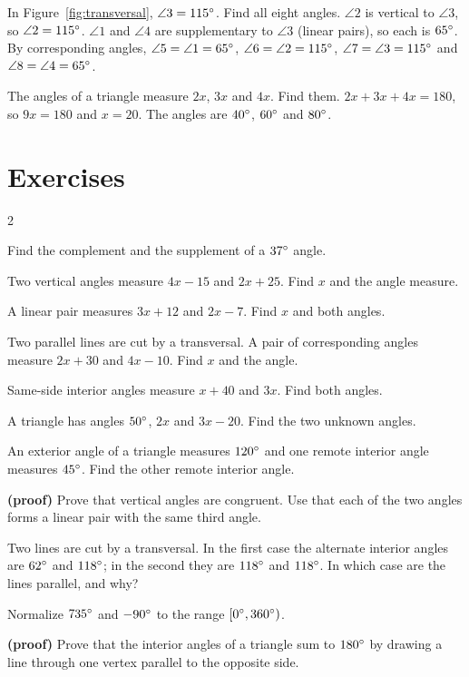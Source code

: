 \begin{example}
In Figure~\ref{fig:transversal}, $\angle 3 = 115^\circ$. Find all eight angles.
\solution $\angle 2$ is vertical to $\angle 3$, so $\angle 2 = 115^\circ$. $\angle 1$ and $\angle 4$ are supplementary to $\angle 3$ (linear pairs), so each is $65^\circ$. By corresponding angles, $\angle 5 = \angle 1 = 65^\circ$, $\angle 6 = \angle 2 = 115^\circ$, $\angle 7 = \angle 3 = 115^\circ$ and $\angle 8 = \angle 4 = 65^\circ$.
\end{example}

\begin{example}
The angles of a triangle measure $2x$, $3x$ and $4x$. Find them.
\solution $2x + 3x + 4x = 180$, so $9x = 180$ and $x = 20$. The angles are $40^\circ$, $60^\circ$ and $80^\circ$.
\end{example}

\section{Exercises}

\begin{multicols}{2}
\begin{exercises}
\item Find the complement and the supplement of a $37^\circ$ angle.
\item Two vertical angles measure $4x - 15$ and $2x + 25$. Find $x$ and the angle measure.
\item A linear pair measures $3x + 12$ and $2x - 7$. Find $x$ and both angles.
\item Two parallel lines are cut by a transversal. A pair of corresponding angles measure $2x + 30$ and $4x - 10$. Find $x$ and the angle.
\item Same-side interior angles measure $x + 40$ and $3x$. Find both angles.
\item A triangle has angles $50^\circ$, $2x$ and $3x - 20$. Find the two unknown angles.
\item An exterior angle of a triangle measures $120^\circ$ and one remote interior angle measures $45^\circ$. Find the other remote interior angle.
\item \textbf{(proof)} Prove that vertical angles are congruent. Use that each of the two angles forms a linear pair with the same third angle.
\item Two lines are cut by a transversal. In the first case the alternate interior angles are $62^\circ$ and $118^\circ$; in the second they are $118^\circ$ and $118^\circ$. In which case are the lines parallel, and why?
\item Normalize $735^\circ$ and $-90^\circ$ to the range $[0^\circ, 360^\circ)$.
\item \textbf{(proof)} Prove that the interior angles of a triangle sum to $180^\circ$ by drawing a line through one vertex parallel to the opposite side.
\end{exercises}
\end{multicols}

